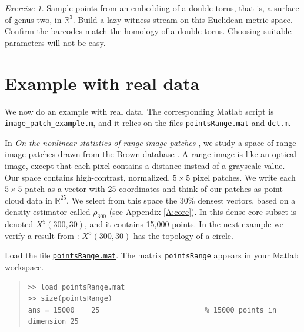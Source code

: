 \documentclass[amscd, amssymb, verbatim]{amsart}[12pt]
\theoremstyle{remark}
\newtheorem{exercise}{Exercise}
\theoremstyle{remark}
\theoremstyle{remark}
\begin{document}
\begin{exercise}
Sample points from an embedding of a double torus, that is, a surface of genus two, in $\mathbb{R}^3$. Build a lazy witness stream on this Euclidean metric space. Confirm the barcodes match the homology of a double torus. Choosing suitable parameters will not be easy.
\end{exercise}


\section{Example with real data}\label{real}

We now do an example with real data. The corresponding Matlab script is \href{https://github.com/appliedtopology/javaplex/tree/master/src/matlab/for_distribution/tutorial_examples/image_patch_example.m}{\texttt{image\_patch\_example.m}}, and it relies on the files \href{https://github.com/appliedtopology/javaplex/tree/master/src/matlab/for_distribution/tutorial_examples/pointsRange.mat}{\texttt{pointsRange.mat}} and \href{https://github.com/appliedtopology/javaplex/tree/master/src/matlab/for_distribution/tutorial_examples/dct.m}{\texttt{dct.m}}. 

In {\em On the nonlinear statistics of range image patches} \citep{Range}, we study a space of range image patches drawn from the Brown database \citep{Mumford}. A range image is like an optical image, except that each pixel contains a distance instead of a grayscale value. Our space contains high-contrast, normalized, $5 \times5$ pixel patches. We write each $5\times5$ patch as a vector with 25 coordinates and think of our patches as point cloud data in $\mathbb{R}^{25}$. We select from this space the 30\% densest vectors, based on a density estimator called $\rho_{300}$ (see Appendix \ref{A:core}). In \citet{Range} this dense core subset is denoted $X^5(300,30)$, and it contains 15,000 points. In the next example we verify a result from \citet{Range}: $X^5(300,30)$ has the topology of a circle. 

Load the file \href{https://github.com/appliedtopology/javaplex/tree/master/src/matlab/for_distribution/tutorial_examples/pointsRange.mat}{\texttt{pointsRange.mat}}. The matrix \texttt{pointsRange} appears in your Matlab workspace.

\begin{quote} \begin{verbatim}
>> load pointsRange.mat
>> size(pointsRange) 
ans = 15000    25                         % 15000 points in dimension 25
\end{verbatim} \end{quote}
\end{document}
